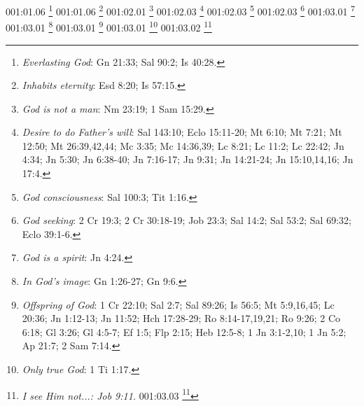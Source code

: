 {{{001:01.06 \footnote{\textit{Everlasting God}: Gn 21:33; Sal 90:2; Is 40:28.}
001:01.06 \footnote{\textit{Inhabits eternity}: Esd 8:20; Is 57:15.}
001:02.01 \footnote{\textit{God is not a man}: Nm 23:19; 1 Sam 15:29.}
001:02.03 \footnote{\textit{Desire to do Father's will}: Sal 143:10; Eclo 15:11-20; Mt 6:10; Mt 7:21; Mt 12:50; Mt 26:39,42,44; Mc 3:35; Mc 14:36,39; Lc 8:21; Lc 11:2; Lc 22:42; Jn 4:34; Jn 5:30; Jn 6:38-40; Jn 7:16-17; Jn 9:31; Jn 14:21-24; Jn 15:10,14,16; Jn 17:4.}
001:02.03 \footnote{\textit{God consciousness}: Sal 100:3; Tit 1:16.}
001:02.03 \footnote{\textit{God seeking}: 2 Cr 19:3; 2 Cr 30:18-19; Job 23:3; Sal 14:2; Sal 53:2; Sal 69:32; Eclo 39:1-6.}
001:03.01 \footnote{\textit{God is a spirit}: Jn 4:24.}
001:03.01 \footnote{\textit{In God's image}: Gn 1:26-27; Gn 9:6.}
001:03.01 \footnote{\textit{Offspring of God}: 1 Cr 22:10; Sal 2:7; Sal 89:26; Is 56:5; Mt 5:9,16,45; Lc 20:36; Jn 1:12-13; Jn 11:52; Hch 17:28-29; Ro 8:14-17,19,21; Ro 9:26; 2 Co 6:18; Gl 3:26; Gl 4:5-7; Ef 1:5; Flp 2:15; Heb 12:5-8; 1 Jn 3:1-2,10; 1 Jn 5:2; Ap 21:7; 2 Sam 7:14.}
001:03.01 \footnote{\textit{Only true God}: 1 Ti 1:17.}
001:03.02 \footnote{\textit{I see Him not...: Job 9:11.}
001:03.03 \footnote{\textit{Cannot see my face..: Ex 33:20.}
001:03.03 \footnote{\textit{Light none can approach}: 1 Ti 6:16.}
001:03.08 \footnote{\textit{Pt 1: God is spirit}: Jn 4:24.}
001:03.08 \footnote{\textit{Pt 2: God is love}: 1 Jn 4:8,16.}
001:04.02 \footnote{\textit{Bodies are temples of God}: Lc 17:21; Ro 8:9-11; 1 Co 3:16-17; 1 Co 6:19; 2 Co 6:16; 2 Ti 1:14; 1 Jn 4:12-15; Ap 21:3.}
001:04.02 \footnote{\textit{Draw all men (spirit gravity): Jer 31:3; Jn 6:44; Jn 12:32.}
001:04.02 \footnote{\textit{I stand at door and knock}: Ap 3:20.}
001:04.03 \footnote{\textit{Body returns to earth}: Gn 2:7; Gn 3:19; Ec 3:20-21; Eclo 33:10.}
001:04.03 \footnote{\textit{Spirit returns to God}: Ec 3:21; Ec 12:7.}
001:04.06 \footnote{\textit{God is no respecter of persons}: 2 Cr 19:7; Job 34:19; Eclo 35:12; Hch 10:34; Ro 2:11; Gl 2:6; Gl 3:28; Ef 6:9; Col 3:11.}
001:05.01 \footnote{\textit{Author of ear hear; eye see}: Sal 94:9.}
001:05.03 \footnote{\textit{God calls stars by name}: Sal 147:4.}
001:05.03 \footnote{\textit{Invisible partly understood}: Ro 1:20.}
001:05.03 \footnote{\textit{Lift up your eyes...: Is 40:26.}
001:05.03 \footnote{\textit{Light no human can near}: 1 Ti 6:16.}
001:05.03 \footnote{\textit{Pt 1: Measures waters in hand}: Is 40:12a.}
001:05.03 \footnote{\textit{Pt 2: Sits on circle of earth}: Is 40:22.}
001:05.04 \footnote{\textit{God's love for world}: Jn 3:16; Ro 5:8; 2 Co 5:18-21; 1 Jn 4:9-10.}
}}}}}}}

